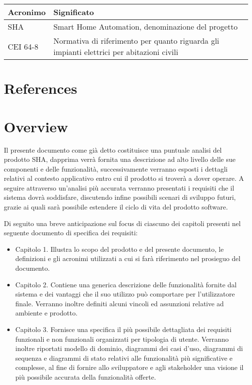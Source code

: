 \documentclass[12pt,a4paper]{report}
\begin{document}
\begin{table}[]
\begin{tabular}{| l | p{10cm} | }
\hline
Acronimo & Significato\\
\hline                                                                               
SHA      & Smart Home Automation, denominazione del progetto                                         \\
CEI 64-8 & Normativa di riferimento per quanto riguarda gli impianti elettrici per abitazioni civili \\
\hline
\end{tabular}
\end{table}

\section{References}
\section{Overview}

Il presente documento come già detto costituisce una puntuale analisi del prodotto SHA, dapprima verrà fornita una descrizione ad alto livello delle sue componenti e delle funzionalità, successivamente verranno esposti i dettagli relativi al contesto applicativo entro cui il prodotto si troverà a dover operare. A seguire attraverso un’analisi più accurata verranno presentati i requisiti che il sistema dovrà soddisfare, discutendo infine possibili scenari di sviluppo futuri, grazie ai quali sarà possibile estendere il ciclo di vita del prodotto software.

Di seguito una breve anticipazione sul focus di ciascuno dei capitoli presenti nel seguente documento di specifica dei requisiti:

\begin{itemize}
\item{}Capitolo 1. Illustra lo scopo del prodotto e del presente documento, le definizioni e gli acronimi utilizzati a cui si farà riferimento nel prosieguo del documento.

\item{}Capitolo 2. Contiene una generica descrizione delle funzionalità fornite dal sistema e dei vantaggi che il suo utilizzo può comportare per l’utilizzatore finale. Verranno inoltre definiti alcuni vincoli ed assunzioni relative ad ambiente e prodotto.

\item{}Capitolo 3. Fornisce una specifica il più possibile dettagliata dei requisiti funzionali e non funzionali organizzati per tipologia di utente. Verranno inoltre riportati modello di dominio, diagrammi dei casi d’uso, diagrammi di sequenza e diagrammi di stato relativi alle funzionalità più significative e complesse, al fine di fornire allo sviluppatore e agli stakeholder una visione il più possibile accurata della funzionalità offerte.
\end{itemize}
\end{document}
